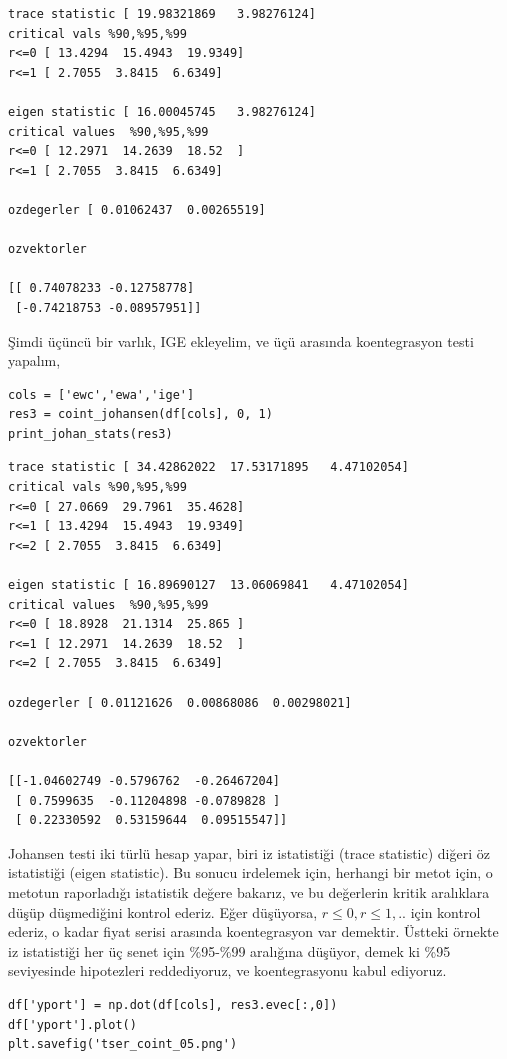 \documentclass[12pt,fleqn]{article}\usepackage{../../common}
\begin{document}
\begin{verbatim}
trace statistic [ 19.98321869   3.98276124]
critical vals %90,%95,%99
r<=0 [ 13.4294  15.4943  19.9349]
r<=1 [ 2.7055  3.8415  6.6349]

eigen statistic [ 16.00045745   3.98276124]
critical values  %90,%95,%99
r<=0 [ 12.2971  14.2639  18.52  ]
r<=1 [ 2.7055  3.8415  6.6349]

ozdegerler [ 0.01062437  0.00265519]

ozvektorler

[[ 0.74078233 -0.12758778]
 [-0.74218753 -0.08957951]]
\end{verbatim}

Şimdi üçüncü bir varlık, IGE ekleyelim, ve üçü arasında koentegrasyon testi
yapalım,

\begin{verbatim}
cols = ['ewc','ewa','ige']
res3 = coint_johansen(df[cols], 0, 1)
print_johan_stats(res3)
\end{verbatim}

\begin{verbatim}
trace statistic [ 34.42862022  17.53171895   4.47102054]
critical vals %90,%95,%99
r<=0 [ 27.0669  29.7961  35.4628]
r<=1 [ 13.4294  15.4943  19.9349]
r<=2 [ 2.7055  3.8415  6.6349]

eigen statistic [ 16.89690127  13.06069841   4.47102054]
critical values  %90,%95,%99
r<=0 [ 18.8928  21.1314  25.865 ]
r<=1 [ 12.2971  14.2639  18.52  ]
r<=2 [ 2.7055  3.8415  6.6349]

ozdegerler [ 0.01121626  0.00868086  0.00298021]

ozvektorler

[[-1.04602749 -0.5796762  -0.26467204]
 [ 0.7599635  -0.11204898 -0.0789828 ]
 [ 0.22330592  0.53159644  0.09515547]]
\end{verbatim}

Johansen testi iki türlü hesap yapar, biri iz istatistiği (trace statistic)
diğeri öz istatistiği (eigen statistic). Bu sonucu irdelemek için, herhangi
bir metot için, o metotun raporladığı istatistik değere bakarız, ve bu
değerlerin kritik aralıklara düşüp düşmediğini kontrol ederiz. Eğer
düşüyorsa, $r \le 0, r \le 1, ..$ için kontrol ederiz, o kadar fiyat serisi
arasında koentegrasyon var demektir. Üstteki örnekte iz istatistiği her üç
senet için \%95-\%99 aralığına düşüyor, demek ki \%95 seviyesinde
hipotezleri reddediyoruz, ve koentegrasyonu kabul ediyoruz. 

\begin{verbatim}
df['yport'] = np.dot(df[cols], res3.evec[:,0])
df['yport'].plot()
plt.savefig('tser_coint_05.png')
\end{verbatim}
\end{document}
